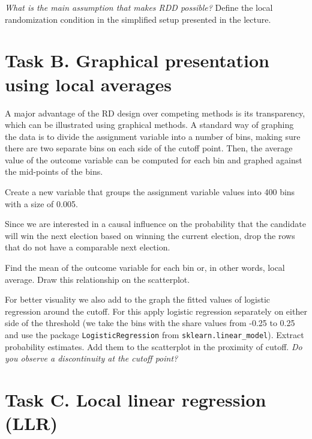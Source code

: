 \begin{boenumerate}

  \item \emph{What is the main assumption that makes RDD possible?} Define the local randomization condition in the simplified setup presented in the lecture.

\end{boenumerate}


\section*{Task B. Graphical presentation using local averages}

A major advantage of the RD design over competing methods is its transparency, which can be illustrated using graphical methods. A standard way of graphing the data is to divide the assignment variable  into a number of bins, making sure there are two separate bins on each side of the cutoff point. Then, the average value of the outcome variable can be computed for each bin and graphed against the mid-points of the bins.

\begin{boenumerate} 

\item Create a new variable that groups the assignment variable values into 400 bins  with a size of 0.005.

\item Since we are interested in a causal influence on the probability that the candidate will win the next election based on winning the current election, drop the rows that do not have a comparable next election.

\item Find the mean of the outcome variable for each bin or, in other words, local average. Draw this relationship on the scatterplot.

\item For better visuality we also add to the graph the fitted values of logistic regression around the cutoff. For this apply logistic regression separately on either side of the threshold (we take the bins with the share values from -0.25 to 0.25 and use the package \texttt{LogisticRegression} from \texttt{sklearn.linear\_model}). Extract probability estimates. Add them to the scatterplot in the proximity of cutoff. \emph{Do you observe a discontinuity at the cutoff point?}
\end{boenumerate}

\section*{Task C. Local linear regression (LLR)}

